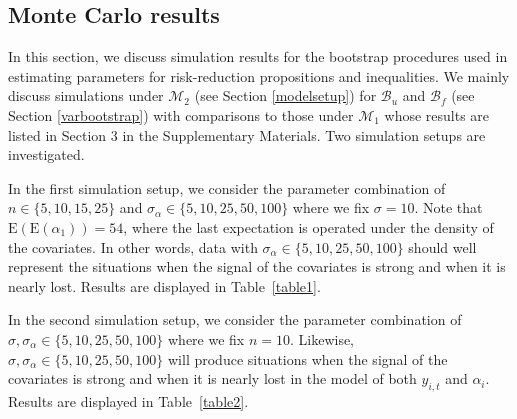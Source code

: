 \documentclass[11pt]{article}
\def\mc#1{\mathcal{#1}} %
\def\E#1{\mathrm{E}(#1)} %
\theoremstyle{definition}
\begin{document}
\subsection{Monte Carlo results}
\label{parametricbootstrapsimulation}

In this section, we discuss simulation results for the bootstrap procedures used in estimating parameters for risk-reduction propositions and inequalities. We mainly discuss simulations under $\mc{M}_2$ (see Section \ref{modelsetup}) for $\mc{B}_u$ and $\mc{B}_f$ (see Section \ref{varbootstrap}) with comparisons to those under $\mc{M}_1$ whose results are listed in Section 3 in the Supplementary Materials. Two simulation setups are investigated. 

In the first simulation setup, we consider the parameter combination of  $n \in \{5, 10, 15, 25\}$ and $\sigma_{\alpha} \in  \{5, 10, 25, 50, 100\}$ where we fix $\sigma=10$. Note that $\E{\E{\alpha_1}}=54$, where the last expectation is operated under the density of the covariates. In other words, data with $\sigma_{\alpha} \in  \{5, 10, 25, 50, 100\}$  should well represent the situations when the signal of the covariates is strong and when it is nearly lost. Results are displayed in Table~\ref{table1}.


In the second simulation setup, we consider the parameter combination of $\sigma, \sigma_{\alpha} \in  \{5, 10, 25, 50, 100\}$ where we fix $n=10$. Likewise, $\sigma, \sigma_{\alpha} \in  \{5, 10, 25, 50, 100\}$ will produce situations when the signal of the covariates is strong and when it is nearly lost in the model of  both $y_{i,t}$ and $\alpha_i$. Results are displayed in Table~\ref{table2}.
\end{document}
